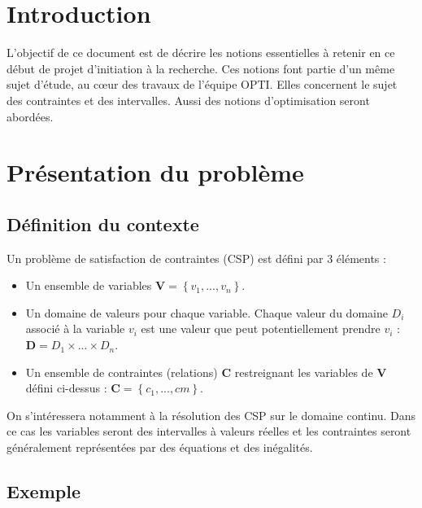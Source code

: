 \section{Introduction }
L'objectif de ce document est de décrire les notions essentielles à retenir en ce début de projet d'initiation à la recherche. Ces notions font partie d'un même sujet d'étude, au cœur des travaux de l'équipe OPTI. Elles concernent le sujet des contraintes et des intervalles. Aussi des notions d'optimisation seront abordées.

\section{Présentation du problème}
\subsection{Définition du contexte}
Un problème de satisfaction de contraintes (CSP) est défini par 3 éléments : 
\begin{itemize}
\item
Un ensemble de variables $\mathbf{V} = \left\{ v_1,...,v_n \right\}$.
\item
Un domaine de valeurs pour chaque variable. Chaque valeur du domaine $D_i$ associé à la variable $v_i$ est une valeur que peut potentiellement prendre $v_i$ : $\mathbf{D} = D_1 \times ... \times D_n $.
\item
Un ensemble de contraintes (relations) $\mathbf{C}$ restreignant les variables de $\mathbf{V}$ défini ci-dessus :  $\mathbf{C} = \left\{c_1,...,cm\right\}$. 
\end{itemize}

On s'intéressera notamment à la résolution des CSP sur le domaine continu. Dans ce cas les variables seront des intervalles à valeurs réelles et les contraintes seront généralement représentées par des équations et des inégalités. 


\subsection{Exemple}

